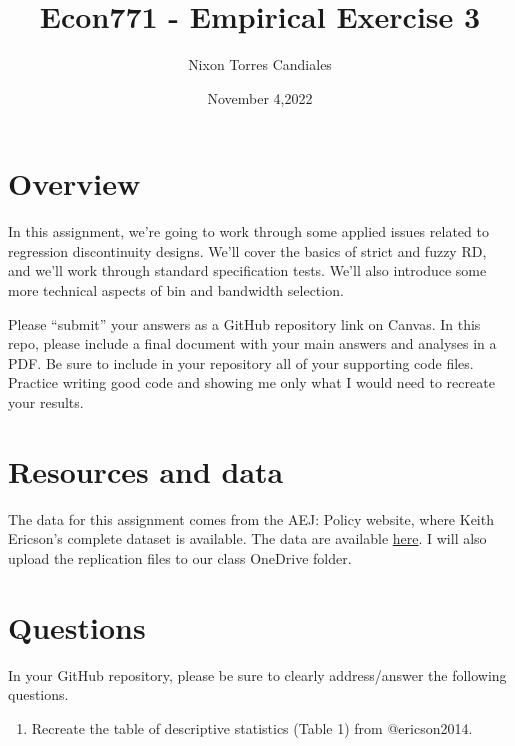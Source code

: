 \documentclass[
  12pt,
]{article}
\title{Econ771 - Empirical Exercise 3}
\author{Nixon Torres Candiales}
\date{November 4,2022}
\providecommand{\tightlist}{%
  \setlength{\itemsep}{0pt}\setlength{\parskip}{0pt}}
\begin{document}
\maketitle

\hypertarget{overview}{%
\section{Overview}\label{overview}}

In this assignment, we're going to work through some applied issues
related to regression discontinuity designs. We'll cover the basics of
strict and fuzzy RD, and we'll work through standard specification
tests. We'll also introduce some more technical aspects of bin and
bandwidth selection.

Please ``submit'' your answers as a GitHub repository link on Canvas. In
this repo, please include a final document with your main answers and
analyses in a PDF. Be sure to include in your repository all of your
supporting code files. Practice writing good code and showing me only
what I would need to recreate your results.

\hypertarget{resources-and-data}{%
\section{Resources and data}\label{resources-and-data}}

The data for this assignment comes from the AEJ: Policy website, where
Keith Ericson's complete dataset is available. The data are available
\href{https://www.aeaweb.org/articles?id=10.1257/pol.6.1.38}{here}. I
will also upload the replication files to our class OneDrive folder.

\hypertarget{questions}{%
\section{Questions}\label{questions}}

In your GitHub repository, please be sure to clearly address/answer the
following questions.

\begin{enumerate}
\def\labelenumi{\arabic{enumi}.}
\tightlist
\item
  Recreate the table of descriptive statistics (Table 1) from
  @ericson2014.
\end{enumerate}
\end{document}
